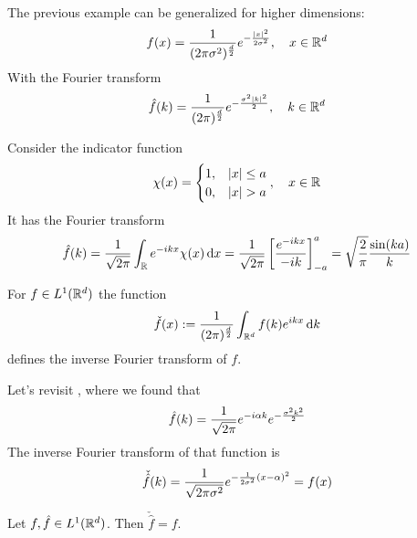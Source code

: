 \documentclass[../../script.tex]{subfiles}
\begin{document}
\begin{eg}
    The previous example can be generalized for higher dimensions:
    \[
        f(x) = \frac{1}{(2\pi\sigma^2)^{\frac{d}{2}}} e^{-\frac{\abs{x}^2}{2\sigma^2}}, \quad x \in \mathbb{R}^d
    \]
    With the Fourier transform
    \[
        \hat{f}(k) = \frac{1}{(2\pi)^{\frac{d}{2}}} e^{-\frac{\sigma^2 \abs{k}^2}{2}}, \quad k \in \mathbb{R}^d
    \]
\end{eg}

\begin{eg}
    Consider the indicator function
    \[
        \chi(x) = \begin{cases}
            1, & \abs{x} \le a \\
            0, & \abs{x} > a
        \end{cases}, \quad x \in \mathbb{R}
    \]
    It has the Fourier transform 
    \[
        \hat{f}(k) = \frac{1}{\sqrt{2\pi}} \int_{\mathbb{R}} e^{-ikx} \chi(x) \dd{x} = \frac{1}{\sqrt{2\pi}} \left[ \frac{e^{-ikx}}{-ik} \right]_{-a}^a = \sqrt{\frac{2}{\pi}} \frac{\sin(ka)}{k}
    \]
\end{eg}

\begin{defi}
    For $f \in L^1(\mathbb{R}^d)$ the function 
    \[
        \check{f}(x) := \frac{1}{(2\pi)^{\frac{d}{2}}} \int_{\mathbb{R}^d} f(k) e^{ikx} \dd{k}
    \]
    defines the inverse Fourier transform of $f$.
\end{defi}

\begin{eg}
    Let's revisit , where we found that
    \[
        \hat{f}(k) = \frac{1}{\sqrt{2\pi}} e^{-i\alpha k} e^{-\frac{\sigma^2 k^2}{2}} 
    \]
    The inverse Fourier transform of that function is 
    \[
        \check{\hat{f}}(k) = \frac{1}{\sqrt{2\pi\sigma^2}} e^{-\frac{1}{2\sigma^2} (x - \alpha)^2} = f(x)
    \]
\end{eg}

\begin{thm}
   Let $f, \hat{f} \in L^1(\mathbb{R}^d)$. Then $\check{\hat{f}} = f$. 
\end{thm}
\end{document}
